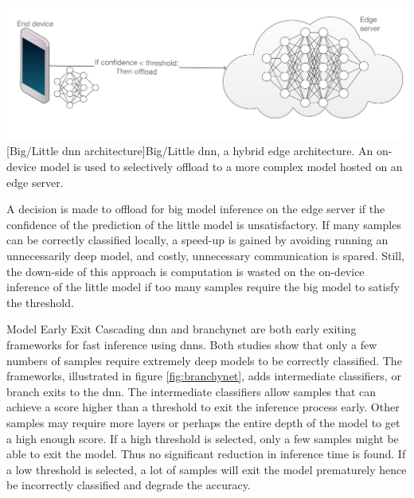 \begin{enumdescript}
	\begin{minipage}[t]{\linewidth}    
		\centering                          
		\includegraphics[width=.8\linewidth]{figures/models/big_little_dnn}
		[Big/Little \gls{dnn} architecture]{Big/Little \gls{dnn}, a hybrid edge architecture. An on-device model is used to selectively offload to a more complex model hosted on an edge server.}
		\label{fig:big/little-dnn}
	\end{minipage}
	
	A decision is made to offload for big model inference on the edge server if the confidence of the prediction of the little model is unsatisfactory. If many samples can be correctly classified locally, a speed-up is gained by avoiding running an unnecessarily deep model, and costly, unnecessary communication is spared. Still, the down-side of this approach is computation is wasted on the on-device inference of the little model if too many samples require the big model to satisfy the threshold. 
	
	\item[Model Early Exit] Cascading \gls{dnn} \cite{leroux_resource-constrained_2015} and \gls{branchynet} \cite{teerapittayanon_branchynet:_2016} are both early exiting frameworks for fast inference using \gls{dnn}s. Both studies show that only a few numbers of samples require extremely deep models to be correctly classified. The frameworks, illustrated in figure \ref{fig:branchynet}, adds intermediate classifiers, or branch exits to the \gls{dnn}. The intermediate classifiers allow samples that can achieve a score higher than a threshold to exit the inference process early. Other samples may require more layers or perhaps the entire depth of the model to get a high enough score. If a high threshold is selected, only a few samples might be able to exit the model. Thus no significant reduction in inference time is found. If a low threshold is selected, a lot of samples will exit the model prematurely hence be incorrectly classified and degrade the accuracy. 
	

\end{enumdescript}
